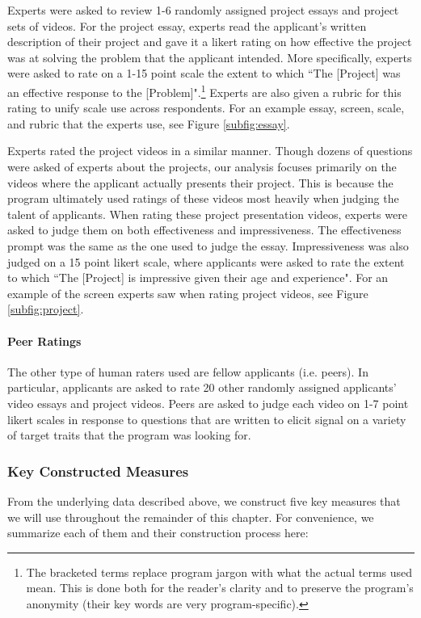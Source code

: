 Experts were asked to review 1-6 randomly assigned project essays and project sets of videos. For the project essay, experts read the applicant's written description of their project and gave it a likert rating on how effective the project was at solving the problem that the applicant intended. More specifically, experts were asked to rate on a 1-15 point scale the extent to which ``The [Project] was an effective response to the [Problem]".\footnote{The bracketed terms replace program jargon with what the actual terms used mean. This is done both for the reader's clarity and to preserve the program's anonymity (their key words are very program-specific).} Experts are also given a rubric for this rating to unify scale use across respondents. For an example essay, screen, scale, and rubric that the experts use, see Figure \ref{subfig:essay}. 

Experts rated the project videos in a similar manner. Though dozens of questions were asked of experts about the projects, our analysis focuses primarily on the videos where the applicant actually presents their project. This is because the program ultimately used ratings of these videos most heavily when judging the talent of applicants. When rating these project presentation videos, experts were asked to judge them on both effectiveness and impressiveness. The effectiveness prompt was the same as the one used to judge the essay. Impressiveness was also judged on a 15 point likert scale, where applicants were asked to rate the extent to which ``The [Project] is impressive given their age and experience". For an example of the screen experts saw when rating project videos, see Figure \ref{subfig:project}. 

\paragraph{Peer Ratings}
The other type of human raters used are fellow applicants (i.e. peers). In particular, applicants are asked to rate 20 other randomly assigned applicants' video essays and project videos. Peers are asked to judge each video on 1-7 point likert scales in response to questions that are written to elicit signal on a variety of target traits that the program was looking for. 

\subsubsection{Key Constructed Measures}

From the underlying data described above, we construct five key measures that we will use throughout the remainder of this chapter. For convenience, we summarize each of them and their construction process here:

